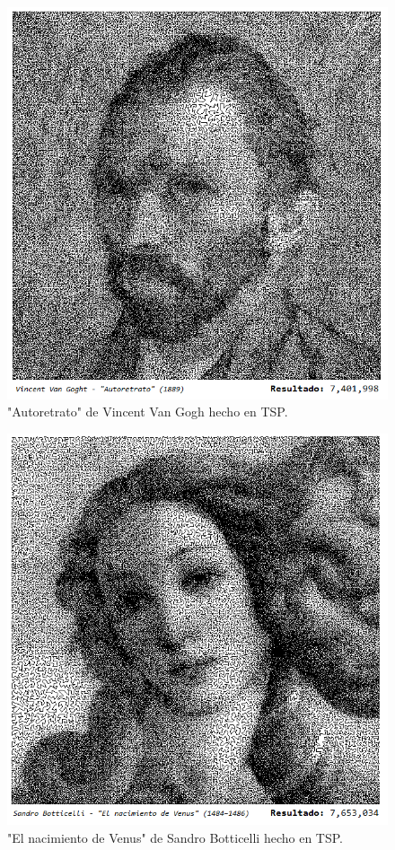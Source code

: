     \begin{figure}[hbtp]
        \centering
            \includegraphics[width=1\textwidth]{PruebasResultados/Imagenes/TSP_ART/vangogh.png}
            \caption{"Autoretrato" de Vincent Van Gogh hecho en TSP.}
            \label{fig:vangogh.png}
    \end{figure}
      \clearpage \newpage  
      
    \begin{figure}[hbtp]
        \centering
            \includegraphics[width=1\textwidth]{PruebasResultados/Imagenes/TSP_ART/Venus.png}
            \caption{"El nacimiento de Venus" de Sandro Botticelli hecho en TSP.}
            \label{fig:Venus.png}
    \end{figure}
      \clearpage \newpage  
      
